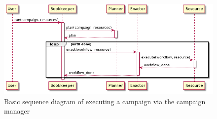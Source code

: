 \begin{figure}[t]
    \centering
    \includegraphics[width=.95\textwidth]{figures/manager/rcm_seq.png}
    \caption{Basic sequence diagram of executing a campaign via the campaign manager}\label{fig:seq_diagram}
\end{figure}



